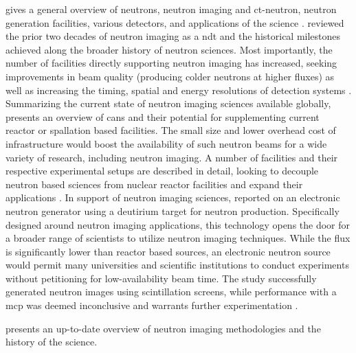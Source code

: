 \documentclass[../../../main.tex]{subfiles}%
\begin{document}
%
    \Xsubsubsection%
    \label{sec:chapter-1:motivation:introduction}%
    \citeauthor*{book:Anderson_2009} gives a general overview of neutrons, neutron imaging and \gls{ct-neutron}, neutron generation facilities, various detectors, and applications of the science \cite{book:Anderson_2009}.
    \citeauthor*{Brenizer_2013} reviewed the prior two decades of neutron imaging as a \gls{ndt} and the historical milestones achieved along the broader history of neutron sciences.
    Most importantly, the number of facilities directly supporting neutron imaging has increased, seeking improvements in beam quality (producing colder neutrons at higher fluxes) as well as increasing the timing, spatial and energy resolutions of detection systems \cite{Brenizer_2013}. 
    Summarizing the current state of neutron imaging sciences available globally, \citeauthor*{Anderson_2016} presents an overview of \gls{cans} and their potential for supplementing current reactor or spallation based facilities.
    The small size and lower overhead cost of infrastructure would boost the availability of such neutron beams for a wide variety of research, including neutron imaging.
    A number of facilities and their respective experimental setups are described in detail, looking to decouple neutron based sciences from nuclear reactor facilities and expand their applications \cite{Anderson_2016}.
    In support of neutron imaging sciences, \citeauthor*{Taylor_2017} reported on an electronic neutron generator using a deutirium target for neutron production.
    Specifically designed around neutron imaging applications, this technology opens the door for a broader range of scientists to utilize neutron imaging techniques.
    While the flux is significantly lower than reactor based sources, an electronic neutron source would permit many universities and scientific institutions to conduct experiments without petitioning for low-availability beam time.
    The study successfully generated neutron images using scintillation screens, while performance with a \gls{mcp} was deemed inconclusive and warrants further experimentation \cite{Taylor_2017}.
    \par%
    \citeauthor*{Lehmann_2017b} presents an up-to-date overview of neutron imaging methodologies and the history of the science.
\end{document}
